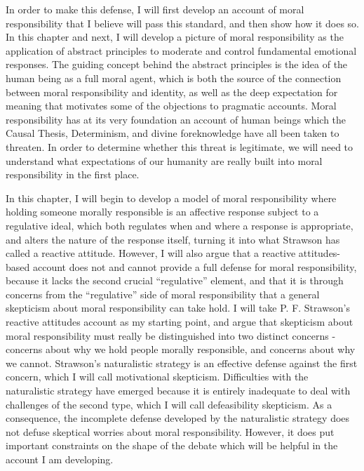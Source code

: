 \documentclass[phd,12pt,oneside,paper=letterpaper]{ubcthesis}
\begin{document}
In order to make this defense, I will first develop an account of moral responsibility that I believe will pass this standard, and then show how it does so. In this chapter and next, I will develop a picture of moral responsibility as the application of abstract principles to moderate and control fundamental emotional responses. The guiding concept behind the abstract principles is the idea of the human being as a full moral agent, which is both the source of the connection between moral responsibility and identity, as well as the deep expectation for meaning that motivates some of the objections to pragmatic accounts. Moral responsibility has at its very foundation an account of human beings which the Causal Thesis, Determinism, and divine foreknowledge have all been taken to threaten. In order to determine whether this threat is legitimate, we will need to understand what expectations of our humanity are really built into moral responsibility in the first place.

In this chapter, I will begin to develop a model of moral responsibility where holding someone morally responsible is an affective response subject to a regulative ideal, which both regulates when and where a response is appropriate, and alters the nature of the response itself, turning it into what Strawson has called a reactive attitude. However, I will also argue that a reactive attitudes-based account does not and cannot provide a full defense for moral responsibility, because it lacks the second crucial ``regulative'' element, and that it is through concerns from the ``regulative'' side of moral responsibility that a general skepticism about moral responsibility can take hold. I will take P. F. Strawson's reactive attitudes account as my starting point, and argue that skepticism about moral responsibility must really be distinguished into two distinct concerns - concerns about why we hold people morally responsible, and concerns about why we cannot. Strawson's naturalistic strategy is an effective defense against the first concern, which I will call motivational skepticism. Difficulties with the naturalistic strategy have emerged because it is entirely inadequate to deal with challenges of the second type, which I will call defeasibility skepticism. As a consequence, the incomplete defense developed by the naturalistic strategy does not defuse skeptical worries about moral responsibility. However, it does put important constraints on the shape of the debate which will be helpful in the account I am developing.
 
\end{document}
